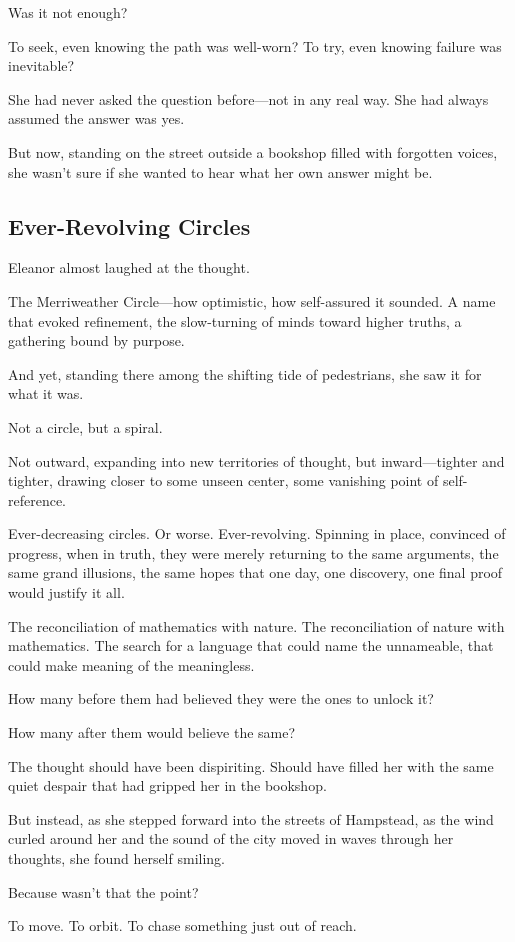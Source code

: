 Was it not enough?

To seek, even knowing the path was well-worn? To try, even knowing failure was inevitable?

She had never asked the question before—not in any real way. She had always assumed the answer was yes.

But now, standing on the street outside a bookshop filled with forgotten voices, she wasn’t sure if she wanted to hear what her own answer might be.

\subsection*{Ever-Revolving Circles}

Eleanor almost laughed at the thought.

\smallskip

The Merriweather Circle—how optimistic, how self-assured it sounded. A name that evoked refinement, the slow-turning of minds toward higher truths, a gathering bound by purpose.

And yet, standing there among the shifting tide of pedestrians, she saw it for what it was.

Not a circle, but a spiral.

Not outward, expanding into new territories of thought, but inward—tighter and tighter, drawing closer to some unseen center, some vanishing point of self-reference.

Ever-decreasing circles. Or worse. Ever-revolving. Spinning in place, convinced of progress, when in truth, they were merely returning to the same arguments, the same grand illusions, the same hopes that one day, one discovery, one final proof would justify it all.

The reconciliation of mathematics with nature. The reconciliation of nature with mathematics. The search for a language that could name the unnameable, that could make meaning of the meaningless.

How many before them had believed they were the ones to unlock it?

How many after them would believe the same?

The thought should have been dispiriting. Should have filled her with the same quiet despair that had gripped her in the bookshop.

But instead, as she stepped forward into the streets of Hampstead, as the wind curled around her and the sound of the city moved in waves through her thoughts, she found herself smiling.

Because wasn’t that the point?

To move. To orbit. To chase something just out of reach.

